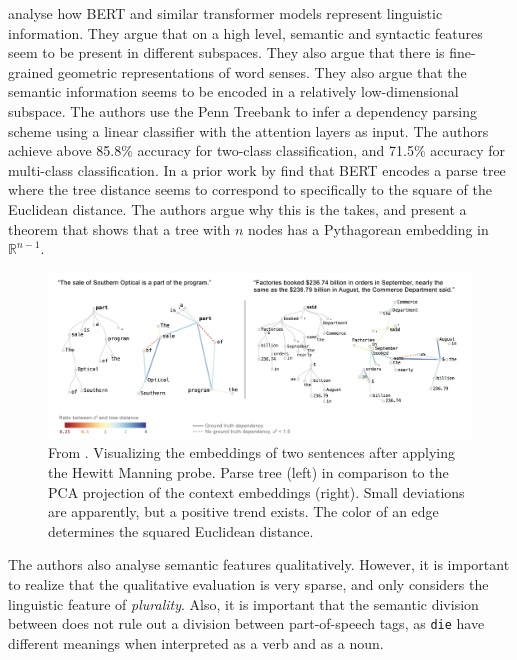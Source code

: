 \documentclass[a4paper,12pt,twoside,openright]{report}
\begin{document}
\cite{coenen19} analyse how BERT and similar transformer models represent linguistic information.
They argue that on a high level, semantic and syntactic features seem to be present in different subspaces.
They also argue that there is fine-grained geometric representations of word senses.
They also argue that the semantic information seems to be encoded in a relatively low-dimensional subspace.
The authors use the Penn Treebank 
to infer a dependency parsing scheme using a linear classifier with the attention layers as input.
The authors achieve above 85.8\% accuracy for two-class classification, and 71.5\% accuracy for multi-class classification.
In a prior work by \cite{hewitt19} find that BERT encodes a parse tree where the tree distance seems to correspond to specifically to the square of the Euclidean distance.
The authors argue why this is the takes, and present a theorem that shows that a tree with $n$ nodes has a Pythagorean embedding in $\mathbb{R}^{n-1}$.

\begin{figure}[H]
	\center
  \includegraphics[width=\linewidth]{./assets/relatedwork/BERT_tree.png}
  \caption{From \cite{coenen19}. Visualizing the embeddings of two sentences after applying the Hewitt Manning probe. Parse tree (left) in comparison to the PCA projection of the context embeddings (right). Small deviations are apparently, but a positive trend exists. The color of an edge determines the squared Euclidean distance.}
  \label{fig:BERT_tree}
\end{figure}

The authors also analyse semantic features qualitatively.
However, it is important to realize that the qualitative evaluation is very sparse, and only considers the linguistic feature of \textit{plurality}.
Also, it is important that the semantic division between does not rule out a division between part-of-speech tags, as \texttt{die} have different meanings when interpreted as a verb and as a noun.
\end{document}
